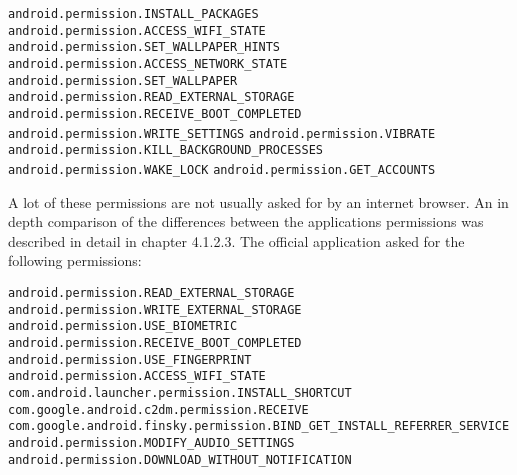 \newline \texttt{android.permission.INSTALL\_PACKAGES}
\newline \texttt{android.permission.ACCESS\_WIFI\_STATE}
\newline \texttt{android.permission.SET\_WALLPAPER\_HINTS}
\newline \texttt{android.permission.ACCESS\_NETWORK\_STATE}
\newline \texttt{android.permission.SET\_WALLPAPER}
\newline \texttt{android.permission.READ\_EXTERNAL\_STORAGE}
\newline \texttt{android.permission.RECEIVE\_BOOT\_COMPLETED}
\newline \texttt{android.permission.WRITE\_SETTINGS}
\newline \texttt{android.permission.VIBRATE}
\newline \texttt{android.permission.KILL\_BACKGROUND\_PROCESSES}
\newline \texttt{android.permission.WAKE\_LOCK}
\newline \texttt{android.permission.GET\_ACCOUNTS}

A lot of these permissions are not usually asked for by an internet browser.
An in depth comparison of the differences between the applications permissions was described in detail in chapter 4.1.2.3.
\newpage
{}
The official application asked for the following permissions:

\texttt{android.permission.READ\_EXTERNAL\_STORAGE }
\newline \texttt{android.permission.WRITE\_EXTERNAL\_STORAGE }
\newline \texttt{android.permission.USE\_BIOMETRIC }
\newline \texttt{android.permission.RECEIVE\_BOOT\_COMPLETED}
\newline \texttt{android.permission.USE\_FINGERPRINT }
\newline \texttt{android.permission.ACCESS\_WIFI\_STATE}
\newline \texttt{com.android.launcher.permission.INSTALL\_SHORTCUT }
\newline \texttt{com.google.android.c2dm.permission.RECEIVE}
\newline \texttt{com.google.android.finsky.permission.BIND\_GET\_INSTALL\_REFERRER\_SERVICE}
\newline \texttt{android.permission.MODIFY\_AUDIO\_SETTINGS }
\newline \texttt{android.permission.DOWNLOAD\_WITHOUT\_NOTIFICATION}

